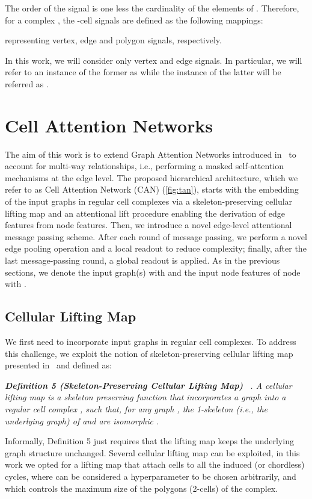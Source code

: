 \documentclass{article}
\begin{document}
The order of the signal is one less the cardinality of the elements of . Therefore, for a complex , the -cell signals are defined as the following mappings: 

representing vertex, edge and polygon signals, respectively. 

In this work, we will consider only vertex and edge signals. In particular, we will refer to an instance of the former as  while the instance of the latter will be referred as . 


\section{Cell Attention Networks}\label{sec:can}

The aim of this work is to extend Graph Attention Networks introduced in~\cite{velivckovic2017graph} to account for multi-way relationships, i.e., performing a masked self-attention mechanisms at the edge level. The proposed hierarchical architecture, which we refer to as Cell Attention Network (CAN) (\ref{fig:tan}), starts with the embedding of the input graphs in regular cell complexes via a skeleton-preserving cellular lifting map and an attentional lift procedure enabling the derivation of edge features from node features. Then, we introduce a novel edge-level attentional message passing scheme. After each round of message passing, we perform a novel edge pooling operation and a local readout to reduce complexity; finally, after the last message-passing round, a global readout is applied. As in the previous sections, we denote the input graph(s) with  and the input node features of node  with .

\subsection{Cellular Lifting Map}

We first need to incorporate input graphs in  regular cell complexes. To address this challenge, we exploit the notion of skeleton-preserving cellular lifting map presented in~\cite{bodnarcwnet} and defined as:

\textit{\textbf{Definition 5 (Skeleton-Preserving Cellular Lifting Map) }~\cite{bodnarcwnet}. A cellular lifting map  is a skeleton preserving function that incorporates a graph  into a regular cell complex , such that, for any graph , the 1-skeleton (i.e., the underlying graph) of   and  are isomorphic .}

Informally, Definition 5 just requires that the lifting map keeps the underlying graph structure unchanged. Several cellular lifting map can be exploited, in this work we opted for a lifting map that attach cells to all the induced (or chordless) cycles, where  can be considered a hyperparameter to be chosen arbitrarily, and which controls the maximum size of the polygons (2-cells) of the complex. 
\end{document}

